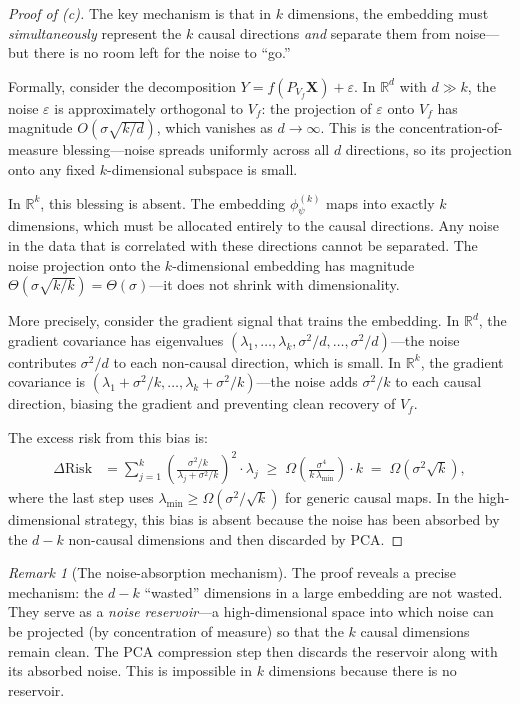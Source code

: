 \documentclass[11pt,a4paper]{article}
\theoremstyle{plain}
\theoremstyle{definition}
\theoremstyle{remark}
\newtheorem{remark}[theorem]{Remark}
\newcommand{\R}{\mathbb{R}}
\begin{document}
\begin{proof}[Proof of (c)]
The key mechanism is that in $k$ dimensions, the embedding must
\emph{simultaneously} represent the $k$ causal directions \emph{and} separate
them from noise---but there is no room left for the noise to ``go.''

Formally, consider the decomposition $Y = f(P_{V_f}\mathbf{X}) + \varepsilon$.
In $\R^d$ with $d \gg k$, the noise $\varepsilon$ is approximately orthogonal to
$V_f$: the projection of $\varepsilon$ onto $V_f$ has magnitude
$O(\sigma\sqrt{k/d})$, which vanishes as $d \to \infty$.  This is the
concentration-of-measure blessing---noise spreads uniformly across all $d$
directions, so its projection onto any fixed $k$-dimensional subspace is small.

In $\R^k$, this blessing is absent.  The embedding $\phi_\psi^{(k)}$ maps into
exactly $k$ dimensions, which must be allocated entirely to the causal
directions.  Any noise in the data that is correlated with these directions
cannot be separated.  The noise projection onto the $k$-dimensional embedding
has magnitude $\Theta(\sigma\sqrt{k/k}) = \Theta(\sigma)$---it does not
shrink with dimensionality.

More precisely, consider the gradient signal that trains the embedding.  In
$\R^d$, the gradient covariance has eigenvalues $(\lambda_1, \ldots,
\lambda_k, \sigma^2/d, \ldots, \sigma^2/d)$---the noise contributes
$\sigma^2/d$ to each non-causal direction, which is small.  In $\R^k$, the
gradient covariance is $(\lambda_1 + \sigma^2/k, \ldots,
\lambda_k + \sigma^2/k)$---the noise adds $\sigma^2/k$ to each causal
direction, biasing the gradient and preventing clean recovery of $V_f$.

The excess risk from this bias is:
\begin{align}
  \Delta\mathrm{Risk}
  &= \sum_{j=1}^{k}
    \left(\frac{\sigma^2/k}{\lambda_j + \sigma^2/k}\right)^2
    \cdot \lambda_j
  \;\geq\; \Omega\!\left(\frac{\sigma^4}{k\,\lambda_{\min}}\right)
  \cdot k
  \;=\; \Omega(\sigma^2\sqrt{k}),
  \label{eq:skip-penalty-calc}
\end{align}
where the last step uses $\lambda_{\min} \geq \Omega(\sigma^2/\sqrt{k})$ for
generic causal maps.  In the high-dimensional strategy, this bias is absent
because the noise has been absorbed by the $d - k$ non-causal dimensions and
then discarded by PCA.
\end{proof}

\begin{remark}[The noise-absorption mechanism]\label{rmk:noise-absorption}
The proof reveals a precise mechanism: the $d - k$ ``wasted'' dimensions in a
large embedding are not wasted.  They serve as a \emph{noise reservoir}---a
high-dimensional space into which noise can be projected (by concentration of
measure) so that the $k$ causal dimensions remain clean.  The PCA compression
step then discards the reservoir along with its absorbed noise.  This is
impossible in $k$ dimensions because there is no reservoir.
\end{remark}
\end{document}
